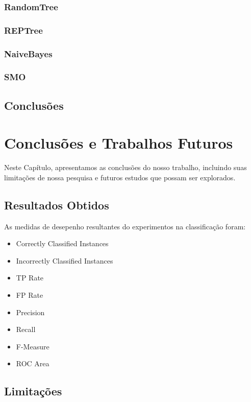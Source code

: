 \documentclass[
	12pt,				%
	openright,			%
	oneside,	
	a4paper,				%
	english,				%
	brazil				%
]{abntex2/abntex2} %
\begin{document}
		\subsection{RandomTree}
		\subsection{REPTree}
		\subsection{NaiveBayes}
		\subsection{SMO}
		
	\section{Conclusões}
\chapter{Conclusões e Trabalhos Futuros}

	Neste Capítulo, apresentamos as conclusões do nosso trabalho, incluindo suas limitações de nossa pesquisa e futuros estudos que possam ser explorados.

	\section{Resultados Obtidos}

	As medidas de desepenho resultantes do experimentos na classificação foram: 
	
	\begin{itemize}
		\item Correctly Classified Instances
		\item Incorrectly Classified Instances
		\item TP Rate
		\item FP Rate
		\item Precision
		\item Recall
		\item F-Measure
		\item ROC Area
	\end{itemize}

	\section{Limitações}
	
\end{document}
